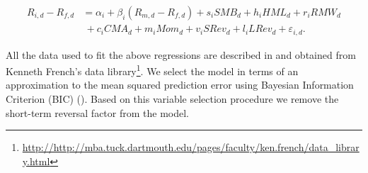 \documentclass[a4paper]{article}
\begin{document}
	\begin{equation}
	\begin{aligned}
	R_{i,d}-R_{f,d}&=\alpha _{i}+\beta _{i}\left( R_{m,d}-R_{f,d}\right)+s_{i}SMB_{d}+h_{i}HML_{d}+r_{i}RMW_{d}\\
	&~+c_{i}CMA_{d}+m_{i}Mom_{d}+v_{i}SRev_{d}+l_{i}LRev_{d}+\varepsilon _{i,d}.
	\end{aligned}
	\label{eq:eq101}
	\end{equation}
	
		All the data used to fit the above regressions are described in and obtained from Kenneth French’s data library\footnote{\url{http://http://mba.tuck.dartmouth.edu/pages/faculty/ken.french/data_library.html}}. We select the model in terms of an approximation to the mean squared prediction error using Bayesian Information Criterion (BIC) (\citet*{Schwarz1978}). Based on this variable selection procedure we remove the short-term reversal factor from the model. 
	
	
	
	
\end{document}
